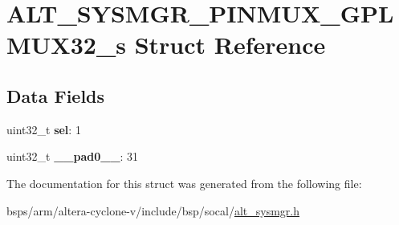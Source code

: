 \hypertarget{structALT__SYSMGR__PINMUX__GPLMUX32__s}{}\section{A\+L\+T\+\_\+\+S\+Y\+S\+M\+G\+R\+\_\+\+P\+I\+N\+M\+U\+X\+\_\+\+G\+P\+L\+M\+U\+X32\+\_\+s Struct Reference}
\label{structALT__SYSMGR__PINMUX__GPLMUX32__s}
\subsection*{Data Fields}
\begin{DoxyCompactItemize}
\item 
\mbox{\label{structALT__SYSMGR__PINMUX__GPLMUX32__s_aab047fbaff48de6844d48a57028a1b38}} 
uint32\+\_\+t {\bfseries sel}\+: 1
\item 
\mbox{\label{structALT__SYSMGR__PINMUX__GPLMUX32__s_a9f22b60b5ff4ba53f339084fd9d5af0b}} 
uint32\+\_\+t {\bfseries \+\_\+\+\_\+pad0\+\_\+\+\_\+}\+: 31
\end{DoxyCompactItemize}


The documentation for this struct was generated from the following file\+:\begin{DoxyCompactItemize}
\item 
bsps/arm/altera-\/cyclone-\/v/include/bsp/socal/\mbox{\hyperlink{alt__sysmgr_8h}{alt\+\_\+sysmgr.\+h}}\end{DoxyCompactItemize}
